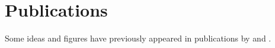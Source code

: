\chapter*{Publications}
Some ideas and figures have previously appeared in publications by \citet{Haberthuer2008,Tsuda2008} and \citet{Haberthuer2010}.